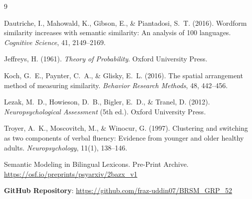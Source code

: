 \documentclass[12pt, a4paper]{article}
\begin{document}

\begin{thebibliography}{9}

Dautriche, I., Mahowald, K., Gibson, E., \& Piantadosi, S.~T. (2016).
\newblock Wordform similarity increases with semantic similarity: An analysis of 100 languages.
\newblock \textit{Cognitive Science}, 41, 2149--2169.

Jeffreys, H. (1961).
\newblock \textit{Theory of Probability}. Oxford University Press.

Koch, G.~E., Paynter, C.~A., \& Glisky, E.~L. (2016).
\newblock The spatial arrangement method of measuring similarity.
\newblock \textit{Behavior Research Methods}, 48, 442--456.

Lezak, M.~D., Howieson, D.~B., Bigler, E.~D., \& Tranel, D. (2012).
\newblock \textit{Neuropsychological Assessment} (5th ed.). Oxford University Press.

Troyer, A.~K., Moscovitch, M., \& Winocur, G. (1997).
\newblock Clustering and switching as two components of verbal fluency: Evidence from younger and older healthy adults.
\newblock \textit{Neuropsychology}, 11(1), 138--146.

Semantic Modeling in Bilingual Lexicons. Pre-Print Archive.
\newblock \url{https://osf.io/preprints/psyarxiv/2bazx_v1}

\end{thebibliography}

\vspace{0.5cm}
\noindent\textbf{GitHub Repository}: \url{https://github.com/fraz-uddin07/BRSM_GRP_52}
\end{document}
